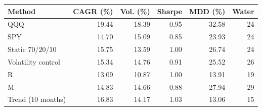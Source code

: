 \begin{tabular}{@{}lrrrrr@{}}\toprule
Method & CAGR (\%) & Vol. (\%) & Sharpe & MDD (\%) & Water\\\midrule
QQQ & 19.44 & 18.39 & 0.95 & 32.58 & 24\\
SPY & 14.70 & 15.09 & 0.85 & 23.93 & 24\\
Static 70/20/10 & 15.75 & 13.59 & 1.00 & 26.74 & 24\\
Volatility control & 15.34 & 14.76 & 0.91 & 25.52 & 26\\
R & 13.09 & 10.87 & 1.00 & 13.91 & 19\\
M & 14.83 & 14.66 & 0.88 & 27.94 & 29\\
Trend (10 months) & 16.83 & 14.17 & 1.03 & 13.06 & 15\\
\bottomrule
\end{tabular}
